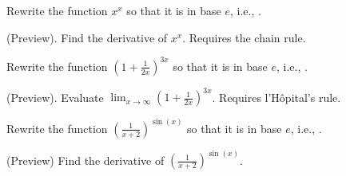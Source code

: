 \documentclass[../main.tex]{subfiles}
\begin{document}
\begin{example} \label{ex:x-to-x}
  Rewrite the function \(x^{x}\) so that it is in base \(e\), i.e., . 


  (Preview). Find the derivative of \(x^{x}\). Requires the chain rule.

\end{example}

\begin{example}
  Rewrite the function \(\left(1 + \frac{1}{2x}\right)^{3x}\) so that it is in base \(e\), i.e., . 


  (Preview). Evaluate \(\lim_{x \to \infty} \left(1 + \frac{1}{2x}\right)^{3x}\). Requires l'H\^opital's rule.

\end{example}

\begin{example}
  Rewrite the function \(\left(\frac{1}{x+2}\right)^{\sin(x)}\) so that it is in base \(e\), i.e., . 


  (Preview) Find the derivative of \(\left(\frac{1}{x+2}\right)^{\sin(x)}\). 

\end{example}
\end{document}

